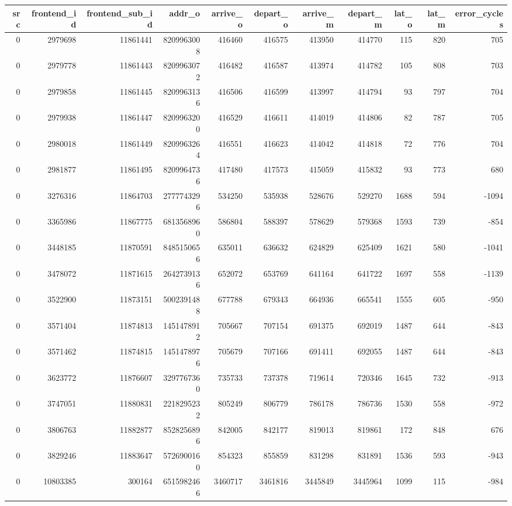 \begin{tabular}{rrrrrrrrrrr}
\toprule
src & frontend\_id & frontend\_sub\_id & addr\_o & arrive\_o & depart\_o & arrive\_m & depart\_m & lat\_o & lat\_m & error\_cycles \\
\midrule
0 & 2979698 & 11861441 & 8209963008 & 416460 & 416575 & 413950 & 414770 & 115 & 820 & 705 \\
0 & 2979778 & 11861443 & 8209963072 & 416482 & 416587 & 413974 & 414782 & 105 & 808 & 703 \\
0 & 2979858 & 11861445 & 8209963136 & 416506 & 416599 & 413997 & 414794 & 93 & 797 & 704 \\
0 & 2979938 & 11861447 & 8209963200 & 416529 & 416611 & 414019 & 414806 & 82 & 787 & 705 \\
0 & 2980018 & 11861449 & 8209963264 & 416551 & 416623 & 414042 & 414818 & 72 & 776 & 704 \\
0 & 2981877 & 11861495 & 8209964736 & 417480 & 417573 & 415059 & 415832 & 93 & 773 & 680 \\
0 & 3276316 & 11864703 & 2777743296 & 534250 & 535938 & 528676 & 529270 & 1688 & 594 & -1094 \\
0 & 3365986 & 11867775 & 6813568960 & 586804 & 588397 & 578629 & 579368 & 1593 & 739 & -854 \\
0 & 3448185 & 11870591 & 8485150656 & 635011 & 636632 & 624829 & 625409 & 1621 & 580 & -1041 \\
0 & 3478072 & 11871615 & 2642739136 & 652072 & 653769 & 641164 & 641722 & 1697 & 558 & -1139 \\
0 & 3522900 & 11873151 & 5002391488 & 677788 & 679343 & 664936 & 665541 & 1555 & 605 & -950 \\
0 & 3571404 & 11874813 & 1451478912 & 705667 & 707154 & 691375 & 692019 & 1487 & 644 & -843 \\
0 & 3571462 & 11874815 & 1451478976 & 705679 & 707166 & 691411 & 692055 & 1487 & 644 & -843 \\
0 & 3623772 & 11876607 & 3297767360 & 735733 & 737378 & 719614 & 720346 & 1645 & 732 & -913 \\
0 & 3747051 & 11880831 & 2218295232 & 805249 & 806779 & 786178 & 786736 & 1530 & 558 & -972 \\
0 & 3806763 & 11882877 & 8528256896 & 842005 & 842177 & 819013 & 819861 & 172 & 848 & 676 \\
0 & 3829246 & 11883647 & 5726900160 & 854323 & 855859 & 831298 & 831891 & 1536 & 593 & -943 \\
0 & 10803385 & 300164 & 6515982466 & 3460717 & 3461816 & 3445849 & 3445964 & 1099 & 115 & -984 \\

\end{tabular}
